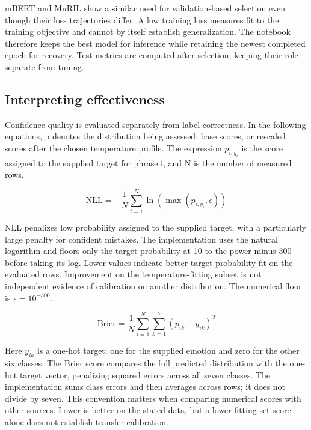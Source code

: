\documentclass[conference]{IEEEtran}
\begin{document}
mBERT and MuRIL show a similar need for validation-based selection even though their loss trajectories differ. A low training loss measures fit to the training objective and cannot by itself establish generalization. The notebook therefore keeps the best model for inference while retaining the newest completed epoch for recovery. Test metrics are computed after selection, keeping their role separate from tuning.

\subsection{Interpreting effectiveness}

Confidence quality is evaluated separately from label correctness. In the following equations, p denotes the distribution being assessed: base scores, or rescaled scores after the chosen temperature profile. The expression \(p_{i,y_i}\) is the score assigned to the supplied target for phrase i, and N is the number of measured rows.

\begin{equation}
\mathrm{NLL}=-\frac{1}{N}\sum_{i=1}^{N}\ln\!\left(\max(p_{i,y_i},\epsilon)\right)
\label{eq:nll}
\end{equation}

NLL penalizes low probability assigned to the supplied target, with a particularly large penalty for confident mistakes. The implementation uses the natural logarithm and floors only the target probability at 10 to the power minus 300 before taking its log. Lower values indicate better target-probability fit on the evaluated rows. Improvement on the temperature-fitting subset is not independent evidence of calibration on another distribution. The numerical floor is \(\epsilon=10^{-300}\).

\begin{equation}
\mathrm{Brier}=\frac{1}{N}\sum_{i=1}^{N}\sum_{k=1}^{7}(p_{ik}-y_{ik})^2
\label{eq:brier}
\end{equation}

Here \(y_{ik}\) is a one-hot target: one for the supplied emotion and zero for the other six classes. The Brier score compares the full predicted distribution with the one-hot target vector, penalizing squared errors across all seven classes. The implementation sums class errors and then averages across rows; it does not divide by seven. This convention matters when comparing numerical scores with other sources. Lower is better on the stated data, but a lower fitting-set score alone does not establish transfer calibration.
\end{document}
